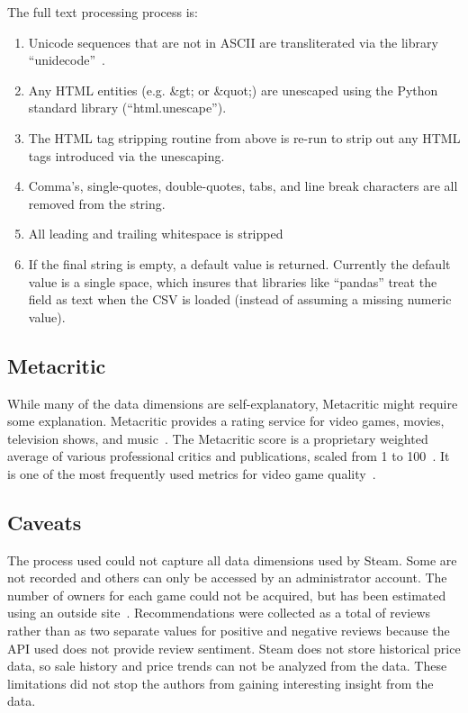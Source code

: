 \documentclass[letterpaper,10pt,twocolumn]{article}
\begin{document}
The full text processing process is:

\begin{enumerate}
    \item Unicode sequences that are not in ASCII are transliterated via the
    library ``unidecode''~\cite{unidecode}.

    \item Any HTML entities (e.g. \&gt; or \&quot;) are unescaped using the Python
    standard library (``html.unescape'').

    \item The HTML tag stripping routine from above is re-run to strip out any
    HTML tags introduced via the unescaping.

    \item Comma's, single-quotes, double-quotes, tabs, and line break characters are
    all removed from the string.

    \item All leading and trailing whitespace is stripped

    \item If the final string is empty, a default value is returned. Currently the
    default value is a single space, which insures that libraries like ``pandas''
    treat the field as text when the CSV is loaded (instead of assuming a missing
    numeric value).
\end{enumerate}


\subsection{Metacritic}

While many of the data dimensions are self-explanatory, Metacritic might
require some explanation. Metacritic provides a rating service for video
games, movies, television shows, and music~\cite{metacritic}. The Metacritic
score is a proprietary weighted average of various professional critics and
publications, scaled from 1 to 100~\cite{metacritic-score}. It is one of the
most frequently used metrics for video game quality~\cite{metacritic-vgdominant}.


\subsection{Caveats}

The process used could not capture all data dimensions used by Steam. Some are
not recorded and others can only be accessed by an administrator account. The
number of owners for each game could not be acquired, but has been estimated
using an outside site~\cite{steamspy}. Recommendations were collected as a
total of reviews rather than as two separate values for positive and negative
reviews because the API used does not provide review sentiment. Steam does not
store historical price data, so sale history and price trends can not be
analyzed from the data. These limitations did not stop the authors from
gaining interesting insight from the data.
\end{document}
